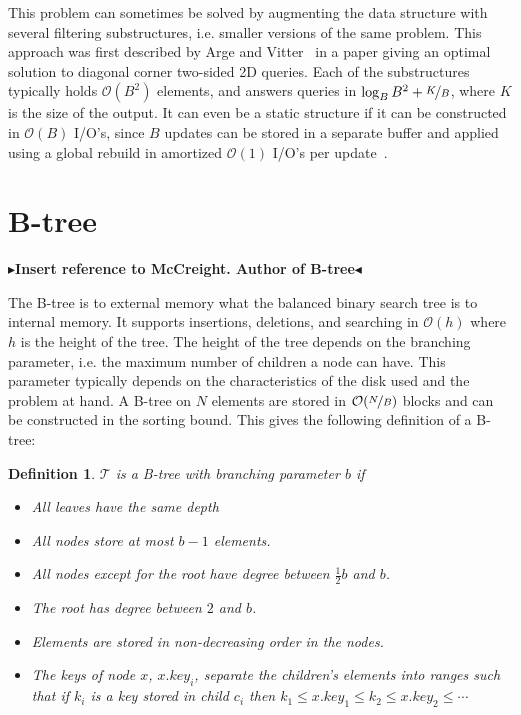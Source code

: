 \documentclass[twoside,11pt,openright]{report}
\newtheorem{definition}{Definition}
\newcommand{\todo}[1]{{\color[rgb]{.5,0,0}\textbf{$\blacktriangleright$#1$\blacktriangleleft$}}}
\begin{document}
This problem can sometimes be solved by augmenting the data structure with several filtering substructures, i.e. smaller versions of the same problem. This approach was first described by Arge and Vitter~\cite{arge_vitter_2003} in a paper giving an optimal solution to diagonal corner two-sided 2D queries. Each of the substructures typically holds $\mathcal{O}(B^2)$ elements, and answers queries in $\log_B B^2 + \nicefrac{K}{B}$, where $K$ is the size of the output. It can even be a static structure if it can be constructed in $\mathcal{O}(B)$ I/O's, since $B$ updates can be stored in a separate buffer and applied using a global rebuild in amortized $\mathcal{O}(1)$ I/O's per update~\cite{vitter_2008}.

\section{B-tree}
\label{sec:prelim_b_tree}
\todo{Insert reference to McCreight. Author of B-tree}

The B-tree is to external memory what the balanced binary search tree is to internal memory. It supports insertions, deletions, and searching in $\mathcal{O}(h)$ where $h$ is the height of the tree. The height of the tree depends on the branching parameter, i.e. the maximum number of children a node can have. This parameter typically depends on the characteristics of the disk used and the problem at hand. A B-tree on $N$ elements are stored in $\mathcal{O}(\nicefrac{N}{B})$ blocks and can be constructed in the sorting bound.
This gives the following definition of a B-tree:

\begin{definition}
\label{def:btree}
$\mathcal{T}$ is a B-tree with branching parameter $b$ if
\begin{itemize}
	\item All leaves have the same depth
	\item All nodes store at most $b-1$ elements.
	\item All nodes except for the root have degree between $\frac{1}{2}b$ and $b$.
	\item The root has degree between $2$ and $b$.
	\item Elements are stored in non-decreasing order in the nodes.
	\item The keys of node $x$, $x.key_i$, separate the children's elements into ranges such that if $k_i$ is a key stored in child $c_i$ then $k_1 \leq x.key_1 \leq k_2 \leq x.key_2 \leq \cdots$
\end{itemize}
\end{definition}
\end{document}
